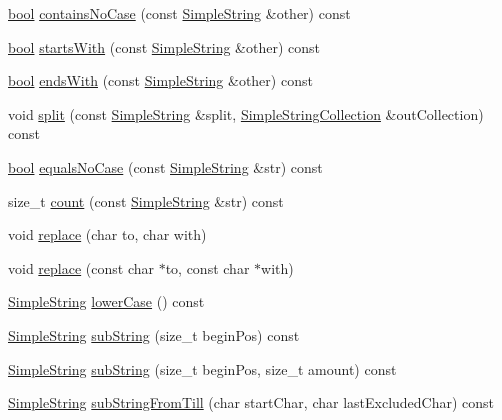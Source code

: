 \begin{DoxyCompactItemize}
\hyperlink{avb__gptp_8h_af6a258d8f3ee5206d682d799316314b1}{bool} \hyperlink{class_simple_string_a4afa2ba099f40ff17ca83600d9162bb4}{contains\+No\+Case} (const \hyperlink{class_simple_string}{Simple\+String} \&other) const 
\item 
\hyperlink{avb__gptp_8h_af6a258d8f3ee5206d682d799316314b1}{bool} \hyperlink{class_simple_string_a3baf65fdd925caecc7dfd8f23ff654c3}{starts\+With} (const \hyperlink{class_simple_string}{Simple\+String} \&other) const 
\item 
\hyperlink{avb__gptp_8h_af6a258d8f3ee5206d682d799316314b1}{bool} \hyperlink{class_simple_string_a96b82881ce1d49cee9ee0585bdf45ffb}{ends\+With} (const \hyperlink{class_simple_string}{Simple\+String} \&other) const 
\item 
void \hyperlink{class_simple_string_afefc06c420c72dacd7a4a0c82cd8b3ac}{split} (const \hyperlink{class_simple_string}{Simple\+String} \&split, \hyperlink{class_simple_string_collection}{Simple\+String\+Collection} \&out\+Collection) const 
\item 
\hyperlink{avb__gptp_8h_af6a258d8f3ee5206d682d799316314b1}{bool} \hyperlink{class_simple_string_aa1ee72ebae5cc3c6fe8c2f42e00f9f89}{equals\+No\+Case} (const \hyperlink{class_simple_string}{Simple\+String} \&str) const 
\item 
size\+\_\+t \hyperlink{class_simple_string_a7b73be1ce4ddc3653ee1bc14ff1ccf3b}{count} (const \hyperlink{class_simple_string}{Simple\+String} \&str) const 
\item 
void \hyperlink{class_simple_string_a432bd98f2897a79d54b8dd64de48247e}{replace} (char to, char with)
\item 
void \hyperlink{class_simple_string_ac243ef2b892871a90b55834b76160e54}{replace} (const char $\ast$to, const char $\ast$with)
\item 
\hyperlink{class_simple_string}{Simple\+String} \hyperlink{class_simple_string_aee982a279515e03429e640a27ced6941}{lower\+Case} () const 
\item 
\hyperlink{class_simple_string}{Simple\+String} \hyperlink{class_simple_string_aa70337d05455667af5f0316572d76d40}{sub\+String} (size\+\_\+t begin\+Pos) const 
\item 
\hyperlink{class_simple_string}{Simple\+String} \hyperlink{class_simple_string_a959926eb9dc522c66cbc4b271ea878d6}{sub\+String} (size\+\_\+t begin\+Pos, size\+\_\+t amount) const 
\item 
\hyperlink{class_simple_string}{Simple\+String} \hyperlink{class_simple_string_a46ed2f75d81906fd729fd5e9e238453d}{sub\+String\+From\+Till} (char start\+Char, char last\+Excluded\+Char) const 

\end{DoxyCompactItemize}
